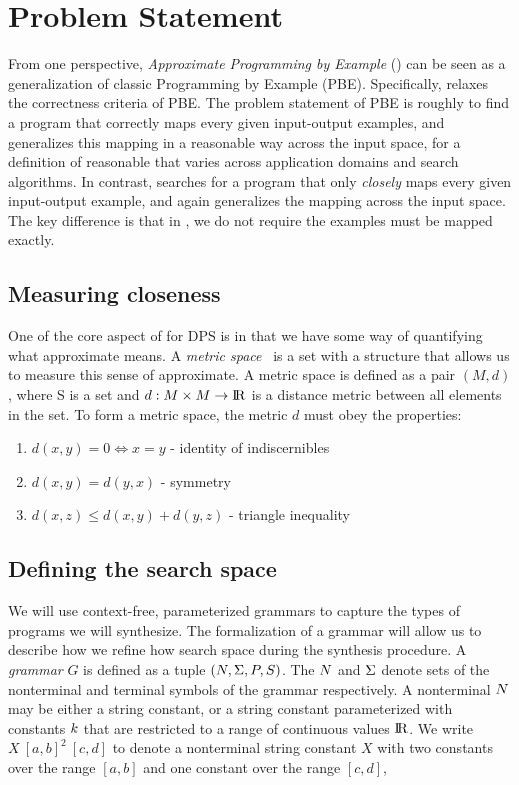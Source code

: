 
\section{Problem Statement}
From one perspective, \textit{Approximate Programming by Example} (\approximatePBE) can be seen as a generalization of classic Programming by Example (PBE).
Specifically, \approximatePBE relaxes the correctness criteria of PBE.
The problem statement of PBE is roughly to find a program that correctly maps every given input-output examples, and generalizes this mapping in a reasonable way across the input space, for a definition of reasonable that varies across application domains and search algorithms.
In contrast, \approximatePBE searches for a program that only \textit{closely} maps every given input-output example, and again generalizes the mapping across the input space.
The key difference is that in \approximatePBE, we do not require the examples must be mapped exactly.


\subsection{Measuring closeness}
One of the core aspect of \approximatePBE for DPS is in that we have some way of quantifying what approximate means.
A \textit{metric space}~\cite{textbook} is a set with a structure that allows us to measure this sense of approximate.
A metric space is defined as a pair $(M,d)$, where S is a set and $d:M \times M \to {\rm I\!R}$ is a distance metric between all elements in the set. 
To form a metric space, the metric $d$ must obey the properties:

\begin{enumerate}
  \item $d(x,y) = 0 \Leftrightarrow x = y$ - identity of indiscernibles
  \item $d(x,y)  = d(y,x)$ - symmetry
  \item $d(x,z) \le d(x,y) + d(y, z)$ - triangle inequality
\end{enumerate}

\subsection{Defining the search space}

We will use context-free, parameterized grammars to capture the types of programs we will synthesize.
The formalization of a grammar will allow us to describe how we refine how search space during the synthesis procedure.
A \textit{grammar} $G$ is defined as a tuple $(N,\Sigma,P,S)$.
The $N$ and $\Sigma$ denote sets of the nonterminal and terminal symbols of the grammar respectively.
A nonterminal $N$ may be either a string constant, or a string constant parameterized with constants ${k}$ that are restricted to a range of continuous values ${\rm I\!R}$.
We write $X\ [a,b]^2 \ [c,d]$ to denote a nonterminal string constant $X$ with two constants over the range $[a,b]$ and one constant over the range $[c,d]$,

